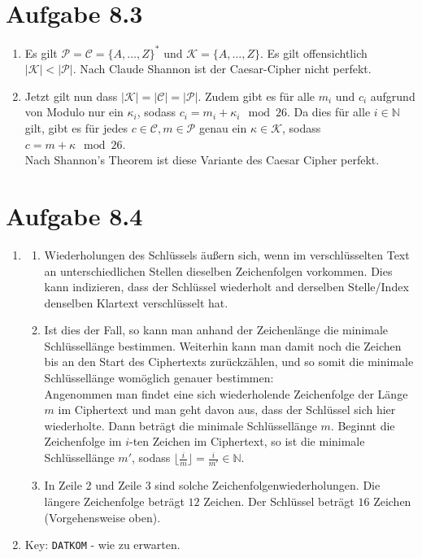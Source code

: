 \documentclass[12pt, a4paper]{article}
\begin{document}
\section*{Aufgabe 8.3}
\begin{enumerate}[label=\alph*)]
	\item	Es gilt $\mathcal{P} = \mathcal{C} = \{A, \dots, Z\}^*$ und $\mathcal{K} = \{A, \dots, Z\}$.  Es gilt offensichtlich $\vert \mathcal{K} \vert < \vert \mathcal{P} \vert$. Nach Claude Shannon ist der Caesar-Cipher nicht perfekt.
	\item	Jetzt gilt nun dass $\vert \mathcal{K} \vert = \vert \mathcal{C} \vert = \vert \mathcal{P} \vert$. Zudem gibt es für alle $m_i$ und $c_i$ aufgrund von Modulo nur ein $\kappa_i$, sodass $c_i = m_i + \kappa_i \mod 26$. Da dies für alle $i \in \mathbb{N}$ gilt, gibt es für jedes $c \in \mathcal{C}, m \in \mathcal{P}$ genau ein $\kappa \in \mathcal{K}$, sodass $c = m + \kappa \mod 26$.\\
			Nach Shannon's Theorem ist diese Variante des Caesar Cipher perfekt.
\end{enumerate}


\newpage


\section*{Aufgabe 8.4}
\begin{enumerate}[label=\alph*)]
	\item	\begin{enumerate}[label=\roman*.]
				\item	Wiederholungen des Schlüssels äußern sich, wenn im verschlüsselten Text an unterschiedlichen Stellen dieselben Zeichenfolgen vorkommen. Dies kann indizieren, dass der Schlüssel wiederholt and derselben Stelle/Index denselben Klartext verschlüsselt hat.
				\item	Ist dies der Fall, so kann man anhand der Zeichenlänge die minimale Schlüssellänge bestimmen. Weiterhin kann man damit noch die Zeichen bis an den Start des Ciphertexts zurückzählen, und so somit die minimale Schlüssellänge womöglich genauer bestimmen:\\
						Angenommen man findet eine sich wiederholende Zeichenfolge der Länge $m$ im Ciphertext und man geht davon aus, dass der Schlüssel sich hier wiederholte. Dann beträgt die minimale Schlüssellänge $m$. Beginnt die Zeichenfolge im $i$-ten Zeichen im Ciphertext, so ist die minimale Schlüssellänge $m'$, sodass $\lfloor \frac{i}{m} \rfloor = \frac{i}{m'} \in \mathbb{N}$.
				\item	In Zeile 2 und Zeile 3 sind solche Zeichenfolgenwiederholungen. Die längere Zeichenfolge beträgt $12$ Zeichen. Der Schlüssel beträgt $16$ Zeichen (Vorgehensweise oben).
			\end{enumerate}
	\item	Key: \verb|DATKOM| - wie zu erwarten.
\end{enumerate}
\end{document}
